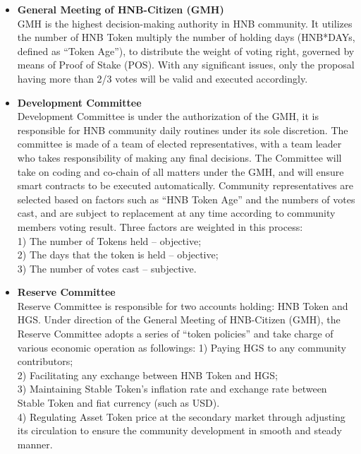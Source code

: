 \documentclass[fleqn,10pt]{SelfArx} %
\begin{document}

\begin{itemize}
\item{\textbf {General Meeting of HNB-Citizen (GMH)}\\
GMH is the highest decision-making authority in HNB community. It utilizes the number of HNB Token multiply the number of holding days (HNB*DAYs, defined as “Token Age”), to distribute the weight of voting right, governed by means of Proof of Stake (POS). With any significant issues, only the proposal having more than 2/3 votes will be valid and executed accordingly. }
\item{\textbf {Development Committee}\\
Development Committee is under the authorization of the GMH, it is responsible for HNB community daily routines under its sole discretion. The committee is made of a team of elected representatives, with a team leader who takes responsibility of making any final decisions. The Committee will take on coding and co-chain of all matters under the GMH, and will ensure smart contracts to be executed automatically. Community representatives are selected based on factors such as “HNB Token Age” and the numbers of votes cast, and are subject to replacement at any time according to community members voting result. Three factors are weighted in this process: \\
1)	The number of Tokens held – objective; \\
2)	The days that the token is held – objective; \\
3)	The number of votes cast – subjective. \\
}
\item{\textbf {Reserve Committee}\\
Reserve Committee is responsible for two accounts holding: HNB Token and HGS. Under direction of the General Meeting of HNB-Citizen (GMH), the Reserve Committee adopts a series of “token policies” and take charge of various economic operation as followings:
1)	Paying HGS to any community contributors; \\
2)	Facilitating any exchange between HNB Token and HGS; \\
3)	Maintaining Stable Token’s inflation rate and exchange rate between Stable Token and fiat currency (such as USD). \\
4)	Regulating Asset Token price at the secondary market through adjusting its circulation to ensure the community development in smooth and steady manner. \\}


\end{itemize}
\end{document}
